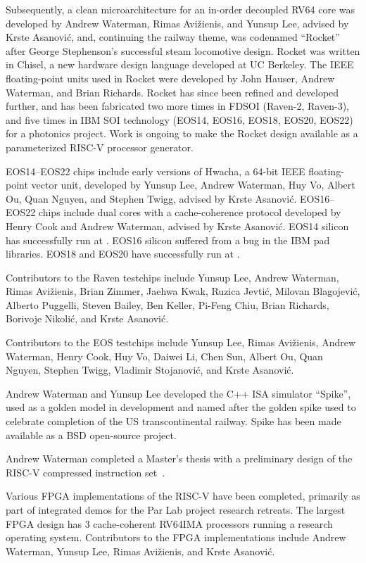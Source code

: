 Subsequently, a clean microarchitecture for an in-order decoupled RV64
core was developed by Andrew Waterman, Rimas Avi\v{z}ienis, and Yunsup
Lee, advised by Krste Asanovi\'{c}, and, continuing the railway theme,
was codenamed ``Rocket'' after George Stephenson's successful steam
locomotive design.  Rocket was written in Chisel, a new hardware
design language developed at UC Berkeley.  The IEEE floating-point
units used in Rocket were developed by John Hauser, Andrew
Waterman, and Brian Richards.
Rocket has since been refined and developed further, and has been
fabricated two more times in  FDSOI (Raven-2, Raven-3),
and five times in IBM  SOI technology (EOS14, EOS16,
EOS18, EOS20, EOS22) for a photonics project.  Work is ongoing to make
the Rocket design available as a parameterized RISC-V processor
generator.

EOS14--EOS22 chips include early versions of Hwacha, a 64-bit IEEE
floating-point vector unit, developed by Yunsup Lee, Andrew Waterman,
Huy Vo, Albert Ou, Quan Nguyen, and Stephen Twigg, advised by Krste
Asanovi\'{c}.  EOS16--EOS22 chips include dual cores with a
cache-coherence protocol developed by Henry Cook and Andrew Waterman,
advised by Krste Asanovi\'{c}.  EOS14 silicon has successfully run at
. EOS16 silicon suffered from a bug in the IBM pad
libraries.  EOS18 and EOS20 have successfully run at .

Contributors to the Raven testchips include Yunsup Lee, Andrew Waterman,
Rimas Avi\v{z}ienis, Brian Zimmer, Jaehwa Kwak, Ruzica Jevti\'{c},
Milovan Blagojevi\'{c}, Alberto Puggelli, Steven Bailey, Ben Keller,
Pi-Feng Chiu, Brian Richards, Borivoje Nikoli\'{c}, and Krste
Asanovi\'{c}.

Contributors to the EOS testchips include Yunsup Lee, Rimas
Avi\v{z}ienis, Andrew Waterman, Henry Cook, Huy Vo, Daiwei Li, Chen Sun,
Albert Ou, Quan Nguyen, Stephen Twigg, Vladimir Stojanovi\'{c}, and
Krste Asanovi\'{c}.

Andrew Waterman and Yunsup Lee developed the C++ ISA simulator
``Spike'', used as a golden model in development and named after the
golden spike used to celebrate completion of the US transcontinental
railway.  Spike has been made available as a BSD open-source project.

Andrew Waterman completed a Master's thesis with a preliminary design
of the RISC-V compressed instruction set~\cite{waterman-ms}. 

Various FPGA implementations of the RISC-V have been completed,
primarily as part of integrated demos for the Par Lab project research
retreats.  The largest FPGA design has 3 cache-coherent RV64IMA
processors running a research operating system.  Contributors to the
FPGA implementations include Andrew Waterman, Yunsup Lee, Rimas
Avi\v{z}ienis, and Krste Asanovi\'{c}.

